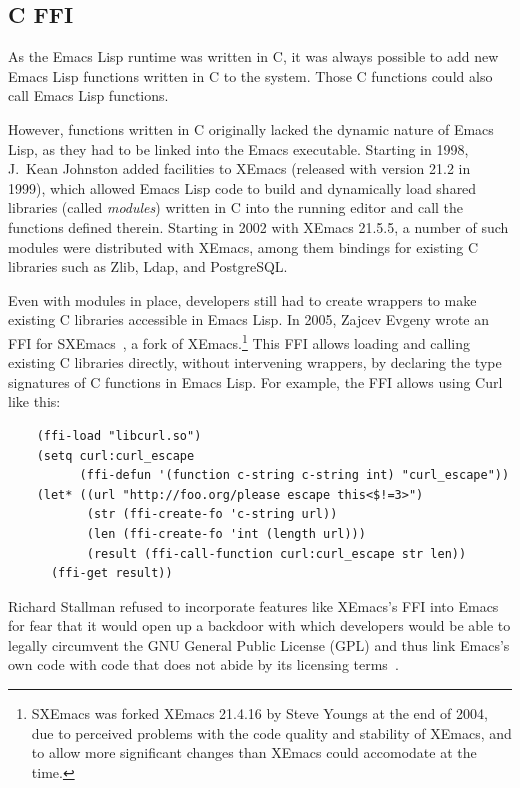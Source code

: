\documentclass[format=acmsmall, review]{acmart}
\newcommand \Elisp {Emacs Lisp}
\begin{document}
\subsection{C FFI}

As the \Elisp{} runtime was written in C, it was always possible to
add new \Elisp{} functions written in C to the system.  Those C
functions could also call \Elisp{} functions.

However, functions written in C originally lacked the dynamic nature
of \Elisp{}, as they had to be linked into the Emacs executable.
Starting in 1998, J.\ Kean Johnston added facilities to XEmacs
(released with version 21.2 in 1999), which allowed \Elisp{} code to
build and dynamically load shared libraries (called \textit{modules})
written in C into the running editor and call the functions defined
therein.  Starting in 2002 with XEmacs 21.5.5, a number of such modules
were distributed with XEmacs, among them bindings for existing C
libraries such as Zlib, Ldap, and PostgreSQL.

Even with modules in place, developers still had to create wrappers to
make existing C libraries accessible in \Elisp{}.  In 2005, Zajcev
Evgeny wrote an FFI for SXEmacs~\cite{SXEmacs}, a fork of
XEmacs.\footnote{SXEmacs was forked XEmacs 21.4.16 by Steve Youngs at
  the end of 2004, due to perceived problems with the code quality and
stability of XEmacs, and to allow more significant changes than XEmacs
could accomodate at the time.}
This FFI allows loading and calling existing C libraries directly,
without intervening wrappers, by declaring the type signatures of C
functions in \Elisp{}.  For example, the FFI allows using Curl like
this:
\begin{verbatim}
    (ffi-load "libcurl.so")
    (setq curl:curl_escape
          (ffi-defun '(function c-string c-string int) "curl_escape"))
    (let* ((url "http://foo.org/please escape this<$!=3>")
           (str (ffi-create-fo 'c-string url))
           (len (ffi-create-fo 'int (length url)))
           (result (ffi-call-function curl:curl_escape str len))
      (ffi-get result))
\end{verbatim}

Richard Stallman refused to incorporate features like XEmacs's FFI into Emacs for fear
that it would open up a backdoor with which developers would be able to
legally circumvent the GNU General Public License (GPL) and thus link
Emacs's own code with code that does not abide by its licensing terms~\cite{RMS03}.
\end{document}
